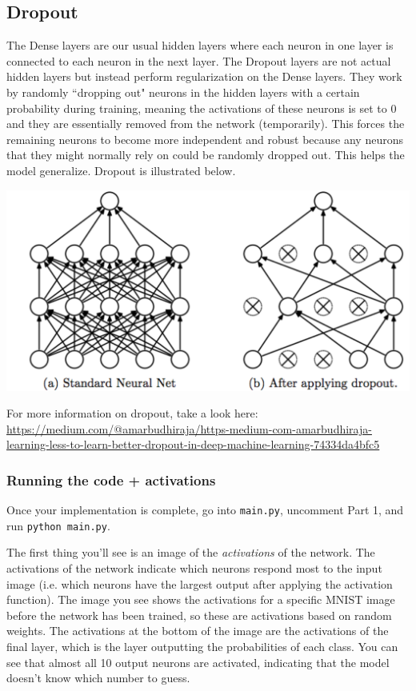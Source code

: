 \documentclass{article}
\begin{document}
\subsection{Dropout}

The Dense layers are our usual hidden layers where each neuron in one layer is connected to each neuron in the next layer. The Dropout layers are not actual hidden layers but instead perform regularization on the Dense layers. They work by randomly ``dropping out" neurons in the hidden layers with a certain probability during training, meaning the activations of these neurons is set to 0 and they are essentially removed from the network (temporarily). This forces the remaining neurons to become more independent and robust because any neurons that they might normally rely on could be randomly dropped out. This helps the model generalize. Dropout is illustrated below.

\begin{center}
    \includegraphics[width=\textwidth]{dropout.png}
\end{center}

For more information on dropout, take a look here: \url{https://medium.com/@amarbudhiraja/https-medium-com-amarbudhiraja-learning-less-to-learn-better-dropout-in-deep-machine-learning-74334da4bfc5}

\subsubsection{Running the code + activations}

Once your implementation is complete, go into \texttt{main.py}, uncomment Part 1, and run \texttt{python main.py}.

The first thing you'll see is an image of the \textit{activations} of the network. The activations of the network indicate which neurons respond most to the input image (i.e. which neurons have the largest output after applying the activation function). The image you see shows the activations for a specific MNIST image before the network has been trained, so these are activations based on random weights. The activations at the bottom of the image are the activations of the final layer, which is the layer outputting the probabilities of each class. You can see that almost all 10 output neurons are activated, indicating that the model doesn't know which number to guess.
\end{document}
